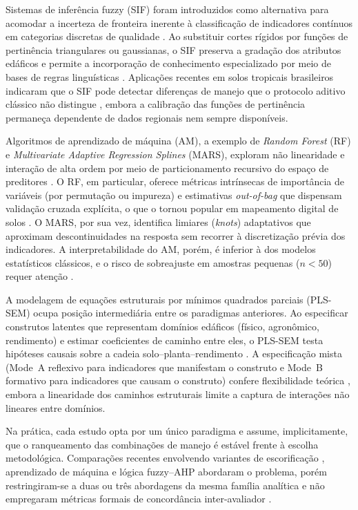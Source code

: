 \documentclass[pdflatex,sn-basic]{sn-jnl}%
\begin{document}
Sistemas de inferência fuzzy (SIF) foram introduzidos como alternativa para acomodar a incerteza de fronteira inerente à classificação de indicadores contínuos em categorias discretas de qualidade \cite{Torbert2008}. Ao substituir cortes rígidos por funções de pertinência triangulares ou gaussianas, o SIF preserva a gradação dos atributos edáficos e permite a incorporação de conhecimento especializado por meio de bases de regras linguísticas \cite{Nabiollahi2018}. Aplicações recentes em solos tropicais brasileiros indicaram que o SIF pode detectar diferenças de manejo que o protocolo aditivo clássico não distingue \cite{DosSantos2021}, embora a calibração das funções de pertinência permaneça dependente de dados regionais nem sempre disponíveis.

Algoritmos de aprendizado de máquina (AM), a exemplo de \textit{Random Forest} (RF) e \textit{Multivariate Adaptive Regression Splines} (MARS), exploram não linearidade e interação de alta ordem por meio de particionamento recursivo do espaço de preditores \cite{Zeraatpisheh2020}. O RF, em particular, oferece métricas intrínsecas de importância de variáveis (por permutação ou impureza) e estimativas \textit{out-of-bag} que dispensam validação cruzada explícita, o que o tornou popular em mapeamento digital de solos \cite{Wadoux2020}. O MARS, por sua vez, identifica limiares (\textit{knots}) adaptativos que aproximam descontinuidades na resposta sem recorrer à discretização prévia dos indicadores. A interpretabilidade do AM, porém, é inferior à dos modelos estatísticos clássicos, e o risco de sobreajuste em amostras pequenas ($n < 50$) requer atenção \cite{Chaudhry2024}.

A modelagem de equações estruturais por mínimos quadrados parciais (PLS-SEM) ocupa posição intermediária entre os paradigmas anteriores. Ao especificar construtos latentes que representam domínios edáficos (físico, agronômico, rendimento) e estimar coeficientes de caminho entre eles, o PLS-SEM testa hipóteses causais sobre a cadeia solo--planta--rendimento \cite{Hair2019,Sarstedt2022}. A especificação mista (Mode~A reflexivo para indicadores que manifestam o construto e Mode~B formativo para indicadores que causam o construto) confere flexibilidade teórica \cite{Diamantopoulos2008}, embora a linearidade dos caminhos estruturais limite a captura de interações não lineares entre domínios.

Na prática, cada estudo opta por um único paradigma e assume, implicitamente, que o ranqueamento das combinações de manejo é estável frente à escolha metodológica. Comparações recentes envolvendo variantes de escorificação \cite{Mukherjee2014}, aprendizado de máquina \cite{Chaudhry2024} e lógica fuzzy--AHP \cite{Pacci2026} abordaram o problema, porém restringiram-se a duas ou três abordagens da mesma família analítica e não empregaram métricas formais de concordância inter-avaliador \cite{Venkateswarlu2025,Liu2025}. 
\end{document}
